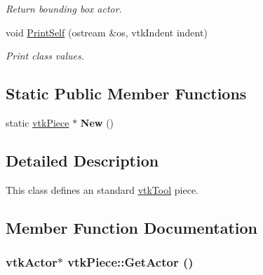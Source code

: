 \begin{DoxyCompactItemize}
\begin{DoxyCompactList}\small\item\em Return bounding box actor. \item\end{DoxyCompactList}\item 
\hypertarget{classvtkPiece_a5873bd2324a6da7d699143679cda8172}{
void \hyperlink{classvtkPiece_a5873bd2324a6da7d699143679cda8172}{PrintSelf} (ostream \&os, vtkIndent indent)}
\label{classvtkPiece_a5873bd2324a6da7d699143679cda8172}

\begin{DoxyCompactList}\small\item\em Print class values. \item\end{DoxyCompactList}\end{DoxyCompactItemize}
\subsection*{Static Public Member Functions}
\begin{DoxyCompactItemize}
\item 
\hypertarget{classvtkPiece_a73754ae9635b1e3854652b106cc39559}{
static \hyperlink{classvtkPiece}{vtkPiece} $\ast$ {\bfseries New} ()}
\label{classvtkPiece_a73754ae9635b1e3854652b106cc39559}

\end{DoxyCompactItemize}


\subsection{Detailed Description}
This class defines an standard \hyperlink{classvtkTool}{vtkTool} piece. 

\subsection{Member Function Documentation}
\hypertarget{classvtkPiece_a6ee22f47f41cc14bdf48f692bc16f1f5}{
\subsubsection[{GetActor}]{\setlength{\rightskip}{0pt plus 5cm}vtkActor$\ast$ vtkPiece::GetActor ()}}
\label{classvtkPiece_a6ee22f47f41cc14bdf48f692bc16f1f5}


